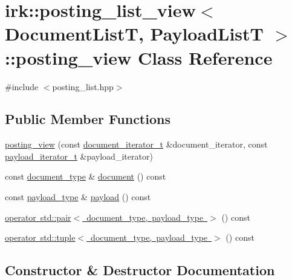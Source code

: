 \hypertarget{classirk_1_1posting__list__view_1_1posting__view}{}\section{irk\+:\+:posting\+\_\+list\+\_\+view$<$ Document\+ListT, Payload\+ListT $>$\+:\+:posting\+\_\+view Class Reference}
\label{classirk_1_1posting__list__view_1_1posting__view}


{\ttfamily \#include $<$posting\+\_\+list.\+hpp$>$}

\subsection*{Public Member Functions}
\begin{DoxyCompactItemize}
\item 
\mbox{\hyperlink{classirk_1_1posting__list__view_1_1posting__view_ac5df0bb8c867238f6ea7f03f4514a10f}{posting\+\_\+view}} (const \mbox{\hyperlink{classirk_1_1posting__list__view_abaca622760e6da2c67d55cf35207250f}{document\+\_\+iterator\+\_\+t}} \&document\+\_\+iterator, const \mbox{\hyperlink{classirk_1_1posting__list__view_a5a153169348a164ea2cb1a18dc76e279}{payload\+\_\+iterator\+\_\+t}} \&payload\+\_\+iterator)
\item 
const \mbox{\hyperlink{classirk_1_1posting__list__view_ac4615e6e3d8ee1eb9a847b7a34919977}{document\+\_\+type}} \& \mbox{\hyperlink{classirk_1_1posting__list__view_1_1posting__view_a5f16627e37b201915b1a257b800a0105}{document}} () const
\item 
const \mbox{\hyperlink{classirk_1_1posting__list__view_a1c394061061a8eeeab98cb228f6cdde9}{payload\+\_\+type}} \& \mbox{\hyperlink{classirk_1_1posting__list__view_1_1posting__view_af30c88656e9aff285bcb6d2669934401}{payload}} () const
\item 
\mbox{\hyperlink{classirk_1_1posting__list__view_1_1posting__view_acc98480fbaa34584c5150329d70cf721}{operator std\+::pair$<$ document\+\_\+type, payload\+\_\+type $>$}} () const
\item 
\mbox{\hyperlink{classirk_1_1posting__list__view_1_1posting__view_ac008317afcbd4beacdf83a9de90b5c37}{operator std\+::tuple$<$ document\+\_\+type, payload\+\_\+type $>$}} () const
\end{DoxyCompactItemize}


\subsection{Constructor \& Destructor Documentation}
\mbox{\label{classirk_1_1posting__list__view_1_1posting__view_ac5df0bb8c867238f6ea7f03f4514a10f}} 
